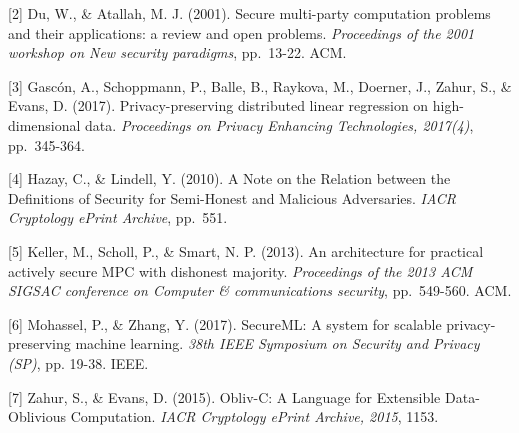 \documentclass{article}
\begin{document}
[2] Du, W., \& Atallah, M. J. (2001). Secure multi-party computation problems and their applications: a review and open problems. {\it Proceedings of the 2001 workshop on New security paradigms}, pp.\ 13-22. ACM.

[3] Gasc\'{o}n, A., Schoppmann, P., Balle, B., Raykova, M., Doerner, J., Zahur, S., \& Evans, D. (2017). Privacy-preserving distributed linear regression on high-dimensional data. {\it Proceedings on Privacy Enhancing Technologies, 2017(4)}, pp.\ 345-364.

[4] Hazay, C., \& Lindell, Y. (2010). A Note on the Relation between the Definitions of Security for Semi-Honest and Malicious Adversaries. {\it IACR Cryptology ePrint Archive}, pp.\ 551.

[5] Keller, M., Scholl, P., \& Smart, N. P. (2013). An architecture for practical actively secure MPC with dishonest majority. {\it Proceedings of the 2013 ACM SIGSAC conference on Computer \& communications security}, pp.\ 549-560. ACM.

[6] Mohassel, P., \& Zhang, Y. (2017). SecureML: A system for scalable privacy-preserving machine learning. {\it 38th IEEE Symposium on Security and Privacy (SP)}, pp. 19-38. IEEE.

[7] Zahur, S., \& Evans, D. (2015). Obliv-C: A Language for Extensible Data-Oblivious Computation. {\it IACR Cryptology ePrint Archive, 2015}, 1153.
\end{document}
